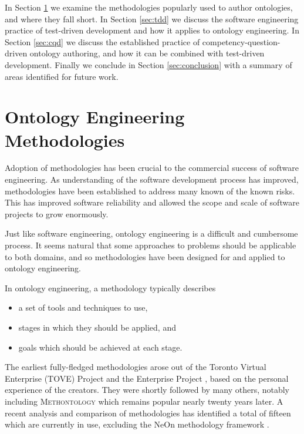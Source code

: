 \documentclass{sig-alternate}
\begin{document}
In Section \ref{sec:methodologies} we examine the methodologies popularly used to author ontologies, and where they fall short.
In Section \ref{sec:tdd} we discuss the software engineering practice of test-driven development and how it applies to ontology engineering.
In Section \ref{sec:cqd} we discuss the established practice of competency-question-driven ontology authoring, and how it can be combined with test-driven development.
Finally we conclude in Section \ref{sec:conclusion} with a summary of areas identified for future work.

\section{Ontology Engineering Methodologies}
\label{sec:methodologies}

Adoption of methodologies has been crucial to the commercial success of software engineering.  As understanding of the software development process has improved, methodologies have been established to address many known of the known risks.  This has improved software reliability and allowed the scope and scale of software projects to grow enormously.

Just like software engineering, ontology engineering is a difficult and cumbersome process.  It seems natural that some approaches to problems should be applicable to both domains, and so methodologies have been designed for and applied to ontology engineering.

In ontology engineering, a methodology typically describes
\begin{itemize}[nosep]
  \item a set of tools and techniques to use,
  \item stages in which they should be applied, and
  \item goals which should be achieved at each stage.
\end{itemize}

The earliest fully-fledged methodologies arose out of the Toronto Virtual Enterprise (TOVE) Project \cite{Gruninger:Methodology} and the Enterprise Project \cite{Uschold:Methodology}, based on the personal experience of the creators.  They were shortly followed by many others, notably including \textsc{Methontology} \cite{Fernandez:Methontology} which remains popular nearly twenty years later.  A recent analysis and comparison of methodologies \cite{Iqbal:Methodologies} has identified a total of fifteen which are currently in use, excluding the NeOn methodology framework \cite{Suarez:NeOn}.
\end{document}
